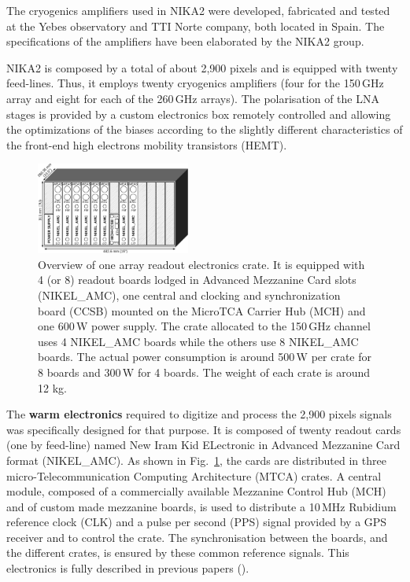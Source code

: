 \documentclass[]{aa} %
\begin{document}
The cryogenics amplifiers used in NIKA2 were developed, fabricated and tested at the Yebes observatory and TTI Norte company, both located in Spain. The specifications of the amplifiers have been elaborated by the NIKA2 group.

NIKA2 is composed by a total of about 2,900 pixels and is equipped with twenty feed-lines. Thus, it employs twenty cryogenics amplifiers (four for the 150\,GHz array and eight for each of the 260\,GHz arrays). The polarisation of the LNA stages is provided by a custom electronics box remotely controlled and allowing the optimizations of the biases according to the slightly different characteristics of the front-end high electrons mobility transistors (HEMT). 

\begin{figure}
\begin{center}
\includegraphics[angle=0,width=0.45\textwidth]{NIKA_crate}
\caption{Overview of one array readout electronics crate.
It is equipped with 4 (or 8) readout boards lodged in Advanced Mezzanine Card slots (NIKEL\_AMC), one central and clocking and synchronization board (CCSB) mounted on the MicroTCA Carrier Hub (MCH) and one 600\,W power supply.
The crate allocated to the 150\,GHz channel uses 4 NIKEL\_AMC boards while the others use 8 NIKEL\_AMC boards. The actual power consumption is around 500\,W per crate for 8 boards and 300\,W for 4 boards. The weight of each crate is around 12 kg.
\label{crateFig}}
\end{center}
\end{figure}

The \textbf{warm electronics} required to digitize and process the 2,900 pixels signals was specifically designed for that purpose.
It is composed of twenty readout cards (one by feed-line) named New Iram Kid ELectronic in Advanced Mezzanine Card format (NIKEL\_AMC).
As shown in Fig.~\ref{crateFig}, the cards are distributed in three micro-Telecommunication Computing Architecture (MTCA) crates.
A central module, composed of a commercially available Mezzanine Control Hub (MCH) and of custom made mezzanine boards, is used to distribute a 10\,MHz Rubidium reference clock (CLK) and a pulse per second (PPS) signal provided by a GPS receiver and to control the crate. The synchronisation between the boards, and the different crates, is ensured by these common reference signals. This electronics is fully described in previous papers (\cite{Bourrion2012,Bourrion2016}).
\end{document}
